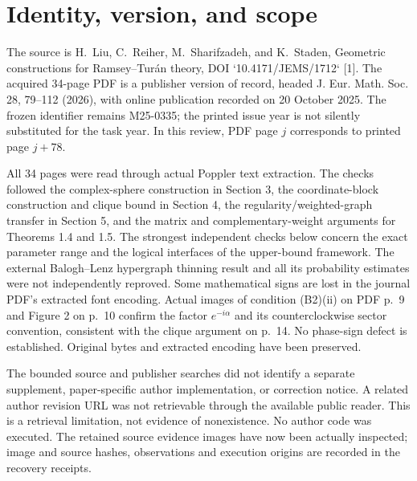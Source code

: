\documentclass[10pt]{article}
\begin{document}
\section*{Identity, version, and scope}
The source is H. Liu, C. Reiher, M. Sharifzadeh, and K. Staden, Geometric constructions for Ramsey–Turán theory, DOI `10.4171/JEMS/1712` [1]. The acquired 34-page PDF is a publisher version of record, headed J. Eur. Math. Soc. 28, 79–112 (2026), with online publication recorded on 20 October 2025. The frozen identifier remains M25-0335; the printed issue year is not silently substituted for the task year. In this review, PDF page \(j\) corresponds to printed page \(j+78\).\par
All 34 pages were read through actual Poppler text extraction. The checks followed the complex-sphere construction in Section 3, the coordinate-block construction and clique bound in Section 4, the regularity/weighted-graph transfer in Section 5, and the matrix and complementary-weight arguments for Theorems 1.4 and 1.5. The strongest independent checks below concern the exact parameter range and the logical interfaces of the upper-bound framework. The external Balogh–Lenz hypergraph thinning result and all its probability estimates were not independently reproved. Some mathematical signs are lost in the journal PDF’s extracted font encoding. Actual images of condition (B2)(ii) on PDF p. 9 and Figure 2 on p. 10 confirm the factor \(e^{-i\alpha}\) and its counterclockwise sector convention, consistent with the clique argument on p. 14. No phase-sign defect is established. Original bytes and extracted encoding have been preserved.\par
The bounded source and publisher searches did not identify a separate supplement, paper-specific author implementation, or correction notice. A related author revision URL was not retrievable through the available public reader. This is a retrieval limitation, not evidence of nonexistence. No author code was executed. The retained source evidence images have now been actually inspected; image and source hashes, observations and execution origins are recorded in the recovery receipts.\par
\end{document}

